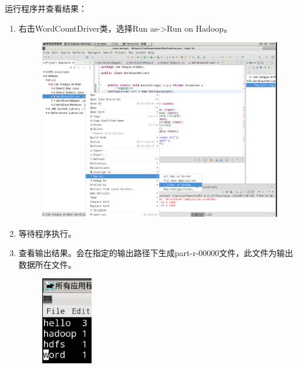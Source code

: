 \documentclass {article}
\begin{document}
				运行程序并查看结果：
				\begin{enumerate}
					\item 右击WordCountDriver类，选择Run as->Run on Hadoop。
					\begin{figure}[H]
						\centering
						\includegraphics[width=4.5in]{figures/fig10.png}
					\end{figure}
				
					\item 等待程序执行。
					\item 查看输出结果。会在指定的输出路径下生成part-r-00000文件，此文件为输出数据所在文件。
					\begin{figure}[H]
						\centering
						\includegraphics{figures/fig11.png}
					\end{figure}
				\end{enumerate}
			
\end{document}
